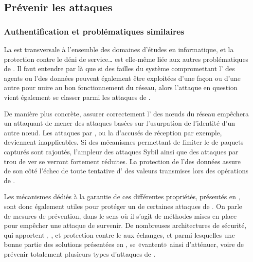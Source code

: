 \subsection{Prévenir les attaques}

    \subsubsection{Authentification et problématiques similaires}
    La \secu est transversale à l'ensemble des domaines d'études en informatique, et la protection contre le déni de service… est elle-même liée aux autres problématiques de \secu.
Il faut entendre par là que si des failles du système compromettant l' des agents ou l'\integrite des données peuvent également être exploitées d'une façon ou d'une autre pour nuire au bon fonctionnement du réseau, alors l'attaque en question vient également se classer parmi les attaques de \dds.

De manière plus concrète, assurer correctement l' des nœuds du réseau empêchera un attaquant de mener des attaques basées sur l'usurpation de l'identité d'un autre nœud.
Les attaques par \desync, ou la  d'accusés de réception par exemple, deviennent inapplicables.
Si des mécanismes permettant de limiter le  de paquets capturés sont rajoutés, l'ampleur des attaques Sybil ainsi que des attaques par trou de ver se verront fortement réduites.
La protection de l'\integrite des données assure de son côté l'échec de toute tentative d' des valeurs transmises lors des opérations de .

Les mécanismes dédiés à la garantie de ces différentes propriétés, présentés en , sont donc également utiles pour protéger un \rc de certaines attaques de \dds.
On parle de mesures de prévention, dans le sens où il s'agit de méthodes mises en place pour empêcher une attaque de survenir.
De nombreuses architectures de sécurité, qui apportent , , \integrite et protection contre le  aux échanges, et parmi lesquelles une bonne partie des solutions présentées en , se «vantent» ainsi d'atténuer, voire de prévenir totalement plusieurs types d'attaques de \dds.

